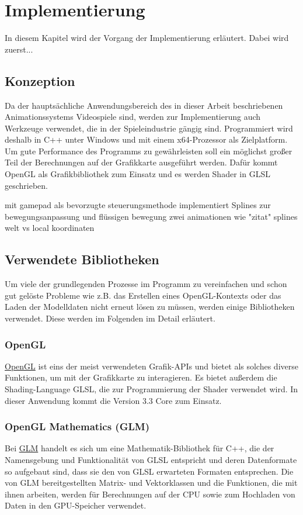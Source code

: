 \chapter{Implementierung}
In diesem Kapitel wird der Vorgang der Implementierung erläutert. Dabei wird zuerst...


\section{Konzeption}
Da der hauptsächliche Anwendungsbereich des in dieser Arbeit beschriebenen Animationssystems Videospiele sind, werden zur Implementierung auch Werkzeuge verwendet, die in der Spieleindustrie gängig sind. Programmiert wird deshalb in C++ unter Windows und mit einem x64-Prozessor als Zielplatform. Um gute Performance des Programms zu gewährleisten soll ein möglichst großer Teil der Berechnungen auf der Grafikkarte ausgeführt werden. Dafür kommt OpenGL als Grafikbibliothek zum Einsatz und es werden Shader in GLSL geschrieben.

mit gamepad als bevorzugte steuerungsmethode implementiert
Splines zur bewegungsanpassung und flüssigen bewegung
zwei animationen wie "zitat"
splines welt vs local koordinaten

\section{Verwendete Bibliotheken}
Um viele der grundlegenden Prozesse im Programm zu vereinfachen und schon gut gelöste Probleme wie z.B. das Erstellen eines OpenGL-Kontexts oder das Laden der Modelldaten nicht erneut lösen zu müssen, werden einige Bibliotheken verwendet. Diese werden im Folgenden im Detail erläutert.

\subsection{OpenGL}
\href{https://www.opengl.org/}{OpenGL} ist eins der meist verwendeten Grafik-APIs und bietet als solches diverse Funktionen, um mit der Grafikkarte zu interagieren. Es bietet außerdem die Shading-Language GLSL, die zur Programmierung der Shader verwendet wird. In dieser Anwendung kommt die Version 3.3 Core zum Einsatz.

\subsection{OpenGL Mathematics (GLM)}
Bei \href{https://glm.g-truc.net/0.9.9/index.html}{GLM} handelt es sich um eine Mathematik-Bibliothek für C++, die der Namensgebung und Funktionalität von GLSL entspricht und deren Datenformate so aufgebaut sind, dass sie den von GLSL erwarteten Formaten entsprechen. Die von GLM bereitgestellten Matrix- und Vektorklassen und die Funktionen, die mit ihnen arbeiten, werden für Berechnungen auf der CPU sowie zum Hochladen von Daten in den GPU-Speicher verwendet.

